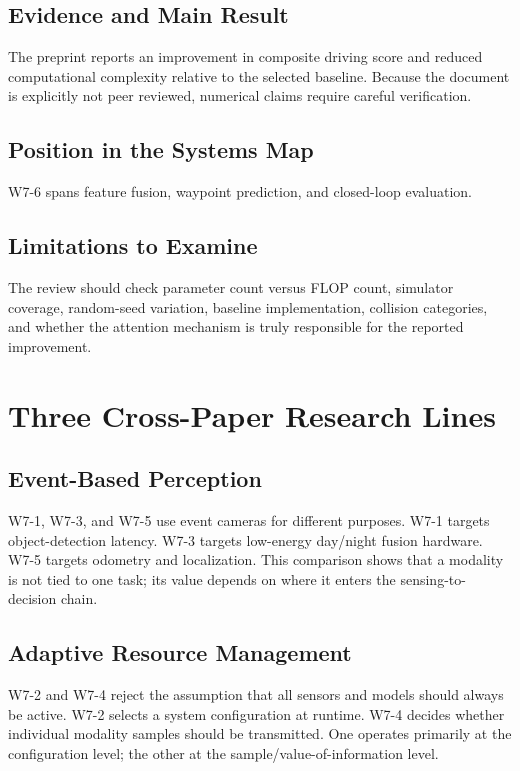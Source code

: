 \subsection{Evidence and Main Result}

The preprint reports an improvement in composite driving score and reduced computational complexity relative to the selected baseline. Because the document is explicitly not peer reviewed, numerical claims require careful verification.

\subsection{Position in the Systems Map}

W7-6 spans feature fusion, waypoint prediction, and closed-loop evaluation.

\subsection{Limitations to Examine}

The review should check parameter count versus FLOP count, simulator coverage, random-seed variation, baseline implementation, collision categories, and whether the attention mechanism is truly responsible for the reported improvement.

\section{Three Cross-Paper Research Lines}

\subsection{Event-Based Perception}

W7-1, W7-3, and W7-5 use event cameras for different purposes. W7-1 targets object-detection latency. W7-3 targets low-energy day/night fusion hardware. W7-5 targets odometry and localization. This comparison shows that a modality is not tied to one task; its value depends on where it enters the sensing-to-decision chain.

\subsection{Adaptive Resource Management}

W7-2 and W7-4 reject the assumption that all sensors and models should always be active. W7-2 selects a system configuration at runtime. W7-4 decides whether individual modality samples should be transmitted. One operates primarily at the configuration level; the other at the sample/value-of-information level.

